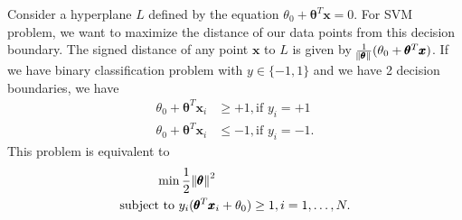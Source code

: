 \documentclass[12pt]{book}
\begin{document}
Consider a hyperplane $L$ defined by the equation $\theta_0 + \pmb{\theta}^T\pmb{x} = 0$.
For SVM problem, we want to maximize the distance of our data points from this decision boundary. The signed distance of any point $\pmb{x}$ to $L$ is given by $\frac{1}{\norm{\pmb{\theta}}}(\theta_0 + \pmb{\theta}^T\pmb{x} )$. If we have binary classification problem with $y\in\{-1,1\}$ and we have 2 decision boundaries, we have
\begin{align*}
\theta_0 + \pmb{\theta}^T\pmb{x}_i &\geq +1, \text{if  } y_i = +1 \\
\theta_0 + \pmb{\theta}^T\pmb{x}_i &\leq -1, \text{if  } y_i = -1.
\end{align*}
This problem is equivalent to 
\begin{align*}
\min \frac{1}{2}\norm{\pmb{\theta}}^2 \ \ \ \ \ \  \ \ \ \ \  \ \  \ \ \ \ \ \ \ \ \ \ \  \ \ \ \ \  \ \  \ \\
\text{subject to }y_i(\pmb{\theta}^T\pmb{x}_i + \theta_0) \geq 1, i=1,\dots,N.
\end{align*}
\end{document}

